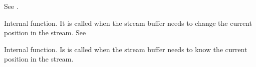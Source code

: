 
See .



Internal function. It is called when the stream buffer needs to change the
current position in the stream. See 



Internal function. Is is called when the stream buffer needs to know the
current position in the stream.

